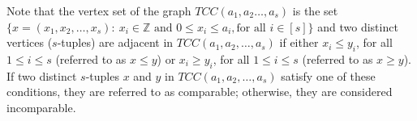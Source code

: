 \documentclass[twoside, 11pt]{article}
\newcommand{\Z}{\mathbb{Z}}
\begin{document}
  

Note that the vertex set of the graph $TCC(a_1,a_2\dots,a_s)$ is the set $\{x=(x_1,x_2,\dots,x_s): \ x_i \in \Z \text{ and } 0 \leq x_i \leq a_i, \text{for all } i \in [s]\}$ and two distinct vertices ($s$-tuples) are adjacent in $TCC(a_1,a_2,\dots,a_s)$ if either $x_i \leq y_i$, for all $1\leq i \leq s$ (referred to as $x \leq y$) or $x_i \geq y_i$, for all $1\leq i \leq s$ (referred to as $x\geq y$). %
If two distinct $s$-tuples $x$ and $y$ in $TCC(a_1,a_2,\dots,a_s)$ satisfy one of these conditions, they are referred to as comparable; otherwise, they are considered incomparable. %
\end{document}
